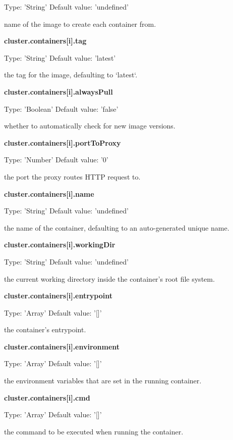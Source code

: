 \documentclass[a4paper,11pt,twoside]{report}
\begin{document}
\begin{appendices}
\noindent
Type: 'String' Default value: 'undefined'\smallskip

\noindent 
name of the image to create each container from.\bigskip

\noindent
\textbf{cluster.containers[i].tag}

\noindent
Type: 'String' Default value: 'latest'\smallskip

\noindent 
the tag for the image, defaulting to `latest`.\bigskip

\noindent
\textbf{cluster.containers[i].alwaysPull}

\noindent
Type: 'Boolean' Default value: 'false'\smallskip

\noindent 
whether to automatically check for new image versions.\bigskip

\noindent
\textbf{cluster.containers[i].portToProxy}

\noindent
Type: 'Number' Default value: '0'\smallskip

\noindent 
the port the proxy routes HTTP request to.\bigskip

\noindent
\textbf{cluster.containers[i].name}

\noindent
Type: 'String' Default value: 'undefined'\smallskip

\noindent 
the name of the container, defaulting to an auto-generated unique name.\bigskip

\noindent
\textbf{cluster.containers[i].workingDir}

\noindent
Type: 'String' Default value: 'undefined'\smallskip

\noindent 
the current working directory inside the container's root file system.\bigskip

\noindent
\textbf{cluster.containers[i].entrypoint}

\noindent
Type: 'Array' Default value: '[]'\smallskip

\noindent 
the container's entrypoint.\bigskip

\noindent
\textbf{cluster.containers[i].environment}

\noindent
Type: 'Array' Default value: '[]'\smallskip

\noindent 
the environment variables that are set in the running container.\bigskip

\noindent
\textbf{cluster.containers[i].cmd}

\noindent
Type: 'Array' Default value: '[]'\smallskip

\noindent 
the command to be executed when running the container.\bigskip


\end{appendices}
\end{document}
